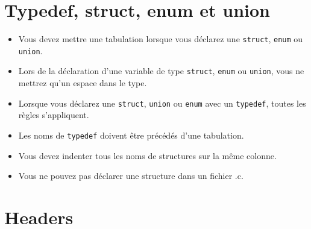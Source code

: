 \documentclass{42-fr}
\begin{document}
    \section{Typedef, struct, enum et union}

        \begin{itemize}

            \item Vous devez mettre une tabulation lorsque vous déclarez une \texttt{struct}, \texttt{enum} ou \texttt{union}.

            \item Lors de la déclaration d’une variable de type \texttt{struct}, \texttt{enum} ou \texttt{union},
                vous ne mettrez qu’un espace dans le type.

            \item Lorsque vous déclarez une \texttt{struct}, \texttt{union} ou \texttt{enum} avec un \texttt{typedef},
                toutes les règles s’appliquent.
            
            \item Les noms de \texttt{typedef} doivent être précédés d'une tabulation.

            \item Vous devez indenter tous les noms de structures sur la même colonne.

            \item Vous ne pouvez pas déclarer une structure dans un fichier .c.

        \end{itemize}
        \newpage


    \section{Headers}
\end{document}
